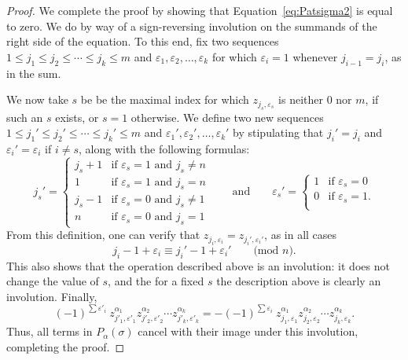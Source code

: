 \documentclass[12pt]{amsart}
\theoremstyle{definition}
\theoremstyle{remark}
\numberwithin{equation}{section}
\renewcommand{\epsilon}{\varepsilon}
\begin{document}
\begin{proof}
We complete the proof by showing that Equation~\eqref{eq:Patsigma2} is equal to zero.  We do by way of a sign-reversing involution on the summands of the right side of the equation.  To this end, fix two sequences $1\le j_1\le j_2\le\cdots\le j_k\le m$ and $\epsilon_1,\epsilon_2,\ldots,\epsilon_k$ for which $\epsilon_{i} = 1$ whenever $j_{i-1} = j_{i}$, as in the sum.  

We now take $s$ be be the maximal index for which $z_{j_{s}, \epsilon_{s}}$ is neither $0$ nor $m$, if such an $s$ exists, or $s = 1$ otherwise.  We define two new sequences $1\le j_1'\le j_2'\le\cdots\le j_k'\le m$ and $\epsilon_1',\epsilon_2',\ldots,\epsilon_k'$ by stipulating that $j_{i}' = j_{i}$ and $\epsilon_{i}' = \epsilon_{i}$ if $i \neq s$, along with the following formulas:
\[
j_{s}' = \begin{cases} 
j_{s} + 1 & \text{if $\epsilon_{s} = 1$ and $j_{s} \neq n$} \\ 
1 & \text{if $\epsilon_{s} = 1$ and $j_{s} = n$} \\
j_{s} - 1 & \text{if $\epsilon_{s} = 0$ and $j_{s} \neq 1$} \\
n & \text{if $\epsilon_{s} = 0$ and $j_{s} = 1$}
\end{cases}
\qquad\text{and}\qquad
\epsilon_{s}' = \begin{cases}
1 & \text{if $\epsilon_{s} = 0$} \\ 
0 & \text{if $\epsilon_{s} = 1$.} \\ 
\end{cases}
\]
From this definition, one can verify that $z_{j_{i}, \epsilon_{i}} = z_{j_{i}', \epsilon_{i}'}$, as in all cases 
\[
j_{i} - 1 + \epsilon_{i} \equiv j_{i}' - 1 + \epsilon_{i}' \qquad \text{(mod $n$)}.
\]
This also shows that the operation described above is an involution: it does not change the value of $s$, and the for a fixed $s$ the description above is clearly an involution.  Finally, 
\[
(-1)^{\sum \epsilon'_i}\ z_{j'_1,\epsilon'_1}^{\alpha_1}z_{j'_2,\epsilon'_2}^{\alpha_2} \cdots z_{j'_k,\epsilon'_k}^{\alpha_k}
  = - (-1)^{\sum \epsilon_i}\ z_{j_1,\epsilon_1}^{\alpha_1}z_{j_2,\epsilon_2}^{\alpha_2} \cdots z_{j_k,\epsilon_k}^{\alpha_k}.
\]
Thus, all terms in $P_{\alpha}(\sigma)$ cancel with their image under this involution, completing the proof.
\end{proof}
\end{document}
